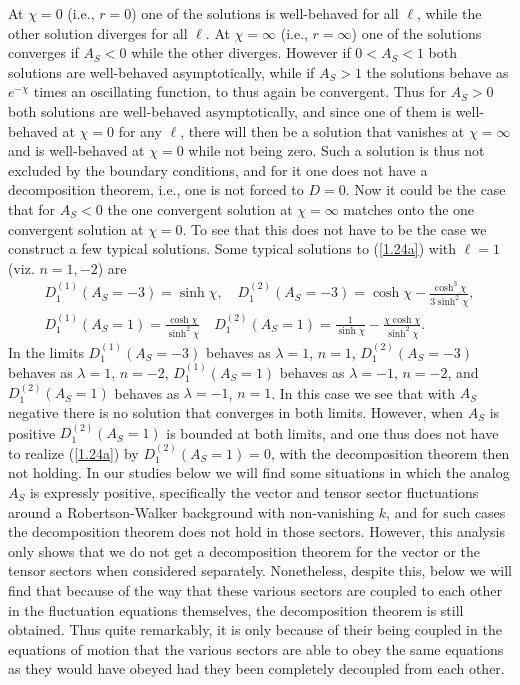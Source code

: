\documentclass[aps,onecolumn,10pt]{revtex4}
\numberwithin{equation}{section}
\numberwithin{equation}{section}
\begin{document}
At $\chi=0$ (i.e., $r=0$) one of the solutions is well-behaved for all $\ell$, while the other solution diverges for all $\ell$. At $\chi=\infty$ (i.e., $r=\infty$) one of the solutions converges if $A_S<0$ while the other diverges. However if $0<A_S<1$ both solutions are well-behaved asymptotically, while if $A_S>1$ the solutions behave as $e^{-\chi}$ times an oscillating function, to thus again be convergent. Thus for $A_S>0$ both solutions are well-behaved asymptotically, and since one of them is well-behaved at $\chi=0$ for any $\ell$, there will then be a solution that vanishes at $\chi=\infty$ and is well-behaved at $\chi=0$ while not being zero. Such a solution is thus not excluded by the boundary conditions, and for it one does not have a decomposition theorem, i.e., one is not forced to $D=0$. Now it could be the case that for $A_S<0$ the one convergent solution at $\chi=\infty$ matches onto the one convergent solution at $\chi=0$. To see that this does not have to be the case we construct a few typical solutions. Some typical solutions to (\ref{1.24a}) with $\ell=1$ (viz. $n=1,-2$) are
%
\begin{eqnarray}
D^{(1)}_1(A_S=-3)=\sinh\chi,\quad D^{(2)}_1(A_S=-3)=\cosh\chi-\frac{\cosh^3\chi}{3\sinh^2\chi},
\nonumber\\
D^{(1)}_1(A_S=1)=\frac{\cosh \chi}{\sinh^2\chi}\quad D^{(2)}_1(A_S=1)=\frac{1}{\sinh\chi}-\frac{\chi\cosh\chi}{\sinh^2\chi}.
\label{1.26a}
\end{eqnarray}
%
In the limits $D^{(1)}_1(A_S=-3)$ behaves as $\lambda=1$, $n=1$, $D^{(2)}_1(A_S=-3)$ behaves as $\lambda=1$, $n=-2$, $D^{(1)}_1(A_S=1)$ behaves as $\lambda=-1$, $n=-2$, and $D^{(2)}_1(A_S=1)$ behaves as $\lambda=-1$, $n=1$. In this case we see that with $A_S$ negative there is no solution that converges in both limits. However, when $A_S$ is positive $D^{(2)}_1(A_S=1)$ is bounded at both limits, and one thus does not have to realize (\ref{1.24a}) by $D^{(2)}_1(A_S=1)=0$, with the decomposition theorem then not holding. In our studies below we will find some situations in which the analog $A_S$ is expressly positive, 
specifically the vector and tensor sector fluctuations around a Robertson-Walker background with non-vanishing $k$, and for such cases the decomposition theorem does not hold in those sectors. However, this analysis only shows that we do not get a decomposition theorem for the vector or the tensor sectors when considered separately. Nonetheless, despite this, below we will find that because of the way that these various sectors are coupled to each other in the fluctuation equations themselves, the decomposition theorem is still obtained. Thus quite remarkably, it is only because of their being coupled in the equations of motion that the various sectors are able to obey the same equations as they would have obeyed had they been completely decoupled from each other.
\end{document}
